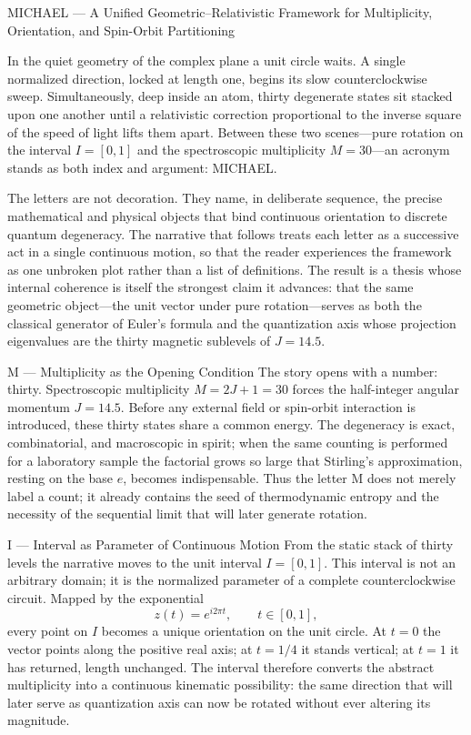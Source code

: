 MICHAEL — A Unified Geometric–Relativistic Framework for Multiplicity, Orientation, and Spin-Orbit Partitioning

In the quiet geometry of the complex plane a unit circle waits. A single normalized direction, locked at length one, begins its slow counterclockwise sweep. Simultaneously, deep inside an atom, thirty degenerate states sit stacked upon one another until a relativistic correction proportional to the inverse square of the speed of light lifts them apart. Between these two scenes—pure rotation on the interval \(I=[0,1]\) and the spectroscopic multiplicity \(M=30\)—an acronym stands as both index and argument: MICHAEL.

The letters are not decoration. They name, in deliberate sequence, the precise mathematical and physical objects that bind continuous orientation to discrete quantum degeneracy. The narrative that follows treats each letter as a successive act in a single continuous motion, so that the reader experiences the framework as one unbroken plot rather than a list of definitions. The result is a thesis whose internal coherence is itself the strongest claim it advances: that the same geometric object—the unit vector under pure rotation—serves as both the classical generator of Euler’s formula and the quantization axis whose projection eigenvalues are the thirty magnetic sublevels of \(J=14.5\).

M — Multiplicity as the Opening Condition
The story opens with a number: thirty. Spectroscopic multiplicity \(M=2J+1=30\) forces the half-integer angular momentum \(J=14.5\). Before any external field or spin-orbit interaction is introduced, these thirty states share a common energy. The degeneracy is exact, combinatorial, and macroscopic in spirit; when the same counting is performed for a laboratory sample the factorial grows so large that Stirling’s approximation, resting on the base \(e\), becomes indispensable. Thus the letter M does not merely label a count; it already contains the seed of thermodynamic entropy and the necessity of the sequential limit that will later generate rotation.

I — Interval as Parameter of Continuous Motion
From the static stack of thirty levels the narrative moves to the unit interval \(I=[0,1]\). This interval is not an arbitrary domain; it is the normalized parameter of a complete counterclockwise circuit. Mapped by the exponential
\[
z(t)=e^{i2\pi t},\qquad t\in[0,1],
\]
every point on \(I\) becomes a unique orientation on the unit circle. At \(t=0\) the vector points along the positive real axis; at \(t=1/4\) it stands vertical; at \(t=1\) it has returned, length unchanged. The interval therefore converts the abstract multiplicity into a continuous kinematic possibility: the same direction that will later serve as quantization axis can now be rotated without ever altering its magnitude.

